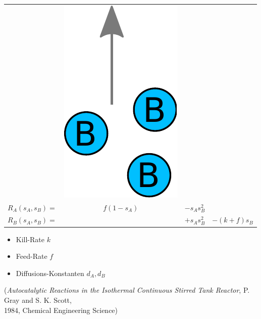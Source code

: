 \documentclass[12pt]{beamer}
\begin{document}
\begin{frame}
\begin{tabular}{ r c c c }
      &
      \includegraphics[scale=0.2]{Bilder/gs_kill.pdf}
	  \\
	  \(
		R_A(s_A,s_B)=
	  \)
	  &
	  \(
		f(1-s_A)
	  \)
	  &
	  \(
		- s_A s_B^2
	  \)
	  &
	  \\
	  \(
		R_B(s_A,s_B)=
	  \)
	  &
	  &
	  \(
		+ s_A s_B^2
	  \)
	  &
	  \(
		- (k + f) s_B
	  \)
	  \\
      \end{tabular}
      \renewcommand{\arraystretch}{1.0}

      \begin{itemize}
	  \item Kill-Rate $k$
	  \item Feed-Rate $f$
	  \item Diffusions-Konstanten $d_A, d_B$
      \end{itemize}
      
      {\tiny (\emph{Autocatalytic Reactions in the Isothermal Continuous Stirred Tank Reactor}, P. Gray and S. K. Scott, \\[-0.15cm]
    1984, Chemical Engineering Science)}
    
      \end{frame}
\end{document}
